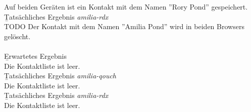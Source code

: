 Auf beiden Geräten ist ein Kontakt mit dem Namen ''Rory Pond'' gespeichert.\\
\b{Tatsächliches Ergebnis \it{amilia-rdx}}\\
TODO
%
Der Kontakt mit dem Namen ''Amilia Pond'' wird in beiden Browsers gelöscht.\\\\
\b{Erwartetes Ergebnis}\\
Die Kontaktliste ist leer.\\
\b{Tatsächliches Ergebnis \it{amilia-qouch}}\\
Die Kontaktliste ist leer.\\
\b{Tatsächliches Ergebnis \it{amilia-rdx}}\\
Die Kontaktliste ist leer.